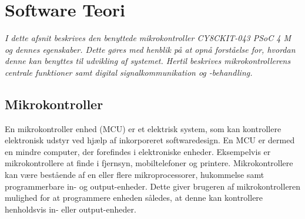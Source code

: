 \section{Software Teori}
\textit{I dette afsnit beskrives den benyttede mikrokontroller CY8CKIT-043 PSoC 4 M og dennes egenskaber. Dette gøres med henblik på at opnå forståelse for, hvordan denne kan benyttes til udvikling af systemet. Hertil beskrives mikrokontrollerens centrale funktioner samt digital signalkommunikation og -behandling.}

\subsection{Mikrokontroller}
En mikrokontroller enhed (MCU) er et elektrisk system, som kan kontrollere elektronisk udstyr ved hjælp af inkorporeret softwaredesign. En MCU er dermed en mindre computer, der forefindes i elektroniske enheder. Eksempelvis er mikrokontrollere at finde i fjernsyn, mobiltelefoner og printere. \citep{Scienceuddannelse,Tanenbaum2006} \newline
Mikrokontrollere kan være bestående af en eller flere mikroprocessorer, hukommelse samt programmerbare in- og output-enheder. Dette giver brugeren af mikrokontrolleren mulighed for at programmere enheden således, at denne kan kontrollere henholdsvis in- eller output-enheder. \citep{Scienceuddannelse,Tanenbaum2006}

